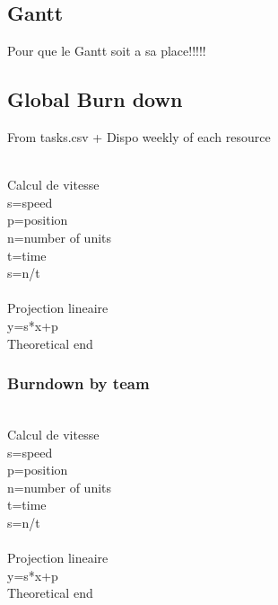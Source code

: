 \documentclass[8pt]{article} %
\begin{document}
\subsection{Gantt}
Pour que le Gantt soit a sa place!!!!!


%

\subsection{Global Burn down}
From tasks.csv + Dispo weekly of each resource


\\
Calcul de vitesse\\
s=speed\\
p=position\\
n=number of units\\
t=time\\
s=n/t\\
\\
Projection lineaire\\
y=s*x+p\\
Theoretical end\\



\subsubsection{Burndown by team}
%

\\
Calcul de vitesse\\
s=speed\\
p=position\\
n=number of units\\
t=time\\
s=n/t\\
\\
Projection lineaire\\
y=s*x+p\\
Theoretical end\\


%
\end{document}
